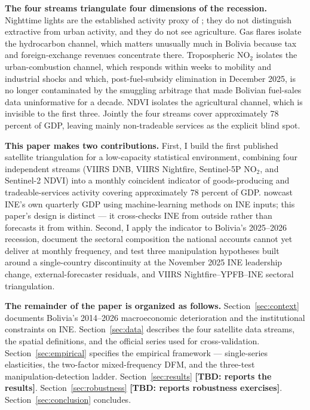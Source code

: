 \documentclass[11pt,letterpaper]{article}
\newcommand{\tbdline}[1]{\textcolor{yellow!60!black}{\textbf{[TBD: #1]}}}
\newcommand{\claim}[1]{\textbf{#1.}}
\begin{document}
\claim{The four streams triangulate four dimensions of the recession} Nighttime lights are the established activity proxy of \citet{hsw2012}; they do not distinguish extractive from urban activity, and they do not see agriculture. Gas flares isolate the hydrocarbon channel, which matters unusually much in Bolivia because tax and foreign-exchange revenues concentrate there. Tropospheric NO$_2$ isolates the urban-combustion channel, which responds within weeks to mobility and industrial shocks and which, post-fuel-subsidy elimination in December 2025, is no longer contaminated by the smuggling arbitrage that made Bolivian fuel-sales data uninformative for a decade. NDVI isolates the agricultural channel, which is invisible to the first three. Jointly the four streams cover approximately \num{78} percent of GDP, leaving mainly non-tradeable services as the explicit blind spot.

\claim{This paper makes two contributions} First, I build the first published satellite triangulation for a low-capacity statistical environment, combining four independent streams (VIIRS DNB, VIIRS Nightfire, Sentinel-5P NO${}_2$, and Sentinel-2 NDVI) into a monthly coincident indicator of goods-producing and tradeable-services activity covering approximately \num{78} percent of GDP. \citet{bolivar_cuba2024} nowcast INE's own quarterly GDP using machine-learning methods on INE inputs; this paper's design is distinct --- it cross-checks INE from outside rather than forecasts it from within. Second, I apply the indicator to Bolivia's \numrange{2025}{2026} recession, document the sectoral composition the national accounts cannot yet deliver at monthly frequency, and test three manipulation hypotheses built around a single-country discontinuity at the November 2025 INE leadership change, external-forecaster residuals, and VIIRS Nightfire--YPFB--INE sectoral triangulation.

\claim{The remainder of the paper is organized as follows} Section~\ref{sec:context} documents Bolivia's \numrange{2014}{2026} macroeconomic deterioration and the institutional constraints on INE. Section~\ref{sec:data} describes the four satellite data streams, the spatial definitions, and the official series used for cross-validation. Section~\ref{sec:empirical} specifies the empirical framework --- single-series elasticities, the two-factor mixed-frequency DFM, and the three-test manipulation-detection ladder. Section~\ref{sec:results} \tbdline{reports the results}. Section~\ref{sec:robustness} \tbdline{reports robustness exercises}. Section~\ref{sec:conclusion} concludes.
\end{document}

